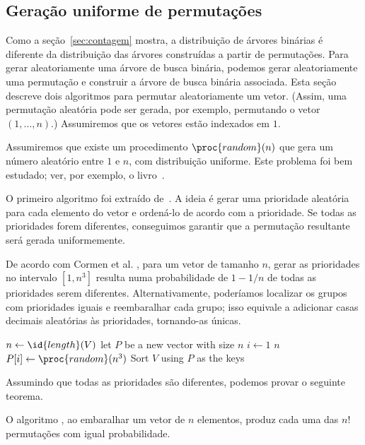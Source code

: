 \subsection{Geração uniforme de permutações}

Como a seção~\ref{sec:contagem} mostra,
a distribuição de árvores binárias é diferente
da distribuição das árvores construídas a partir de permutações.
Para gerar aleatoriamente uma árvore de busca binária,
podemos gerar aleatoriamente uma permutação
e construir a árvore de busca binária associada.
Esta seção descreve dois algoritmos para permutar aleatoriamente um vetor.
(Assim, uma permutação aleatória pode ser gerada, por exemplo,
permutando o vetor $(1, \dots, n)$.)
Assumiremos que os vetores estão indexados em $1$.

Assumiremos que existe um procedimento $\proc{random}(n)$
que gera um número aleatório entre $1$ e $n$, com distribuição uniforme.
Este problema foi bem estudado; ver, por exemplo, o livro~\cite{Knuth1997}.

O primeiro algoritmo foi extraído de~\cite[p.125]{CormenLeisersonRivestStein2009}.
A ideia é gerar uma prioridade aleatória para cada elemento do vetor
e ordená-lo de acordo com a prioridade.
Se todas as prioridades forem diferentes,
conseguimos garantir que a permutação resultante será gerada uniformemente.

De acordo com Cormen et al. \cite[p.~125]{CormenLeisersonRivestStein2009},
para um vetor de tamanho $n$,
gerar as prioridades no intervalo $[1, n^3]$ resulta numa probabilidade de $1-1/n$
de todas as prioridades serem diferentes.
Alternativamente, poderíamos localizar os grupos com prioridades iguais
e reembaralhar cada grupo;
isso equivale a adicionar casas decimais aleatórias às prioridades,
tornando-as únicas.

\begin{codebox}
    \li $n \gets \id{length}(V)$
    \li let $P$ be a new vector with size $n$
    \li \For $i \gets 1$ \To $n$
    \li \Do
            $P[i] \gets \proc{random}(n^3)$
    \End
    \li Sort $V$ using $P$ as the keys
\end{codebox}

Assumindo que todas as prioridades são diferentes, podemos provar o seguinte teorema.

\begin{proposition}
    O algoritmo ,
    ao embaralhar um vetor de $n$ elementos,
    produz cada uma das $n!$ permutações
    com igual probabilidade.
    \label{thm:shuffle-by-sorting}
\end{proposition}

